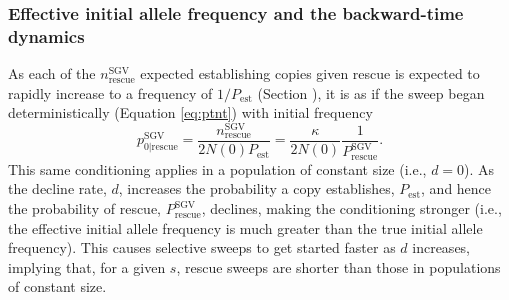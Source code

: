 \documentclass[]{article}
\begin{document}
\subsubsection*{Effective initial allele frequency and the backward-time dynamics}

As each of the $n^\mathrm{SGV}_\mathrm{rescue}$ expected establishing copies given rescue is expected to rapidly increase to a frequency of $1/P_\mathrm{est}$ (Section ), it is as if the sweep began deterministically (Equation \ref{eq:ptnt}) with initial frequency \citep[c.f., equation S1.4 in][]{orr2014population}
\begin{equation}\label{eq:p0sgv}
p_{0|\mathrm{rescue}}^\mathrm{SGV} = \frac{n^\mathrm{SGV}_\mathrm{rescue}}{2N(0)P_\mathrm{est}} = \frac{\kappa}{2N(0)} \frac{1}{P_{\mathrm{rescue}}^{\mathrm{SGV}}}.
\end{equation}
This same conditioning applies in a population of constant size (i.e., $d=0$).
As the decline rate, $d$, increases the probability a copy establishes, $P_\mathrm{est}$, and hence the probability of rescue, $P_\mathrm{rescue}^\mathrm{SGV}$, declines, making the conditioning stronger (i.e., the effective initial allele frequency is much greater than the true initial allele frequency).
This causes selective sweeps to get started faster as $d$ increases, implying that, for a given $s$, rescue sweeps are shorter than those in populations of constant size.
\end{document}
